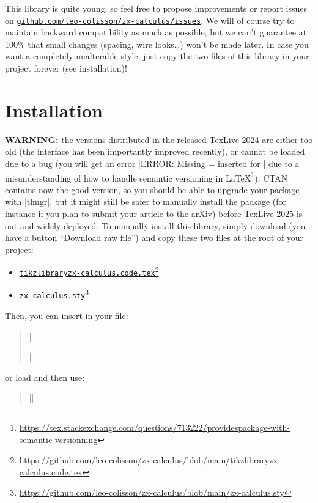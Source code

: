 \documentclass[a4paper,doc2]{ltxdoc} %
\newcommand{\mylink}[2]{\href{#1}{#2}\footnote{\url{#1}}}
\begin{document}
This library is quite young, so feel free to propose improvements or report issues on \href{https://github.com/leo-colisson/zx-calculus/issues}{\texttt{github.com/leo-colisson/zx-calculus/issues}}. We will of course try to maintain backward compatibility as much as possible, but we can't guarantee at 100\% that small changes (spacing, wire looks\dots{}) won't be made later. In case you want a completely unalterable style, just copy the two files of this library in your project forever (see installation)!

\section{Installation}

\textbf{WARNING:} the versions distributed in the released TexLive 2024 are either too old (the interface has been importantly improved recently), or cannot be loaded due to a bug (you will get an error |ERROR: Missing = inserted for \ifnum| due to a misunderstanding of how to handle \mylink{https://tex.stackexchange.com/questions/713222/providespackage-with-semantic-versionning}{semantic versioning in \LaTeX{}}). CTAN contains now the good version, so you should be able to upgrade your package with |tlmgr|, but it might still be safer to manually install the package (for instance if you plan to submit your article to the arXiv) before TexLive 2025 is out and widely deployed. To manually install this library, simply download (you have a button ``Download raw file'') and copy these two files at the root of your project:
\begin{itemize}
\item \mylink{https://github.com/leo-colisson/zx-calculus/blob/main/tikzlibraryzx-calculus.code.tex}{\texttt{tikzlibraryzx-calculus.code.tex}}
\item \mylink{https://github.com/leo-colisson/zx-calculus/blob/main/zx-calculus.sty}{\texttt{zx-calculus.sty}}
\end{itemize}

Then, you can insert in your file:
\begin{verse}
  |\usepackage{zx-calculus}|%
\end{verse}
or load \tikzname{} and then use:
\begin{verse}%
   |\usetikzlibrary{zx-calculus}|%
\end{verse}
\end{document}
